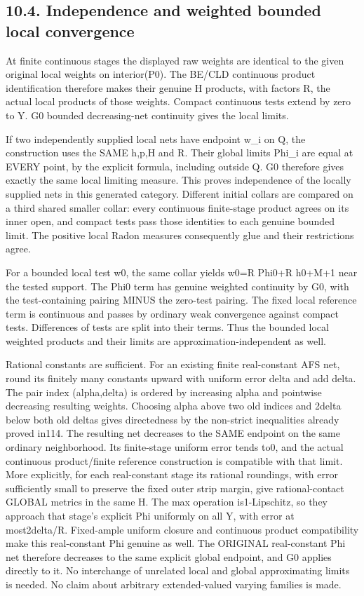 \documentclass[
  10pt,
]{article}
\begin{document}
\subsection{10.4. Independence and weighted bounded local
convergence}\label{independence-and-weighted-bounded-local-convergence}

At finite continuous stages the displayed raw weights are identical to
the given original local weights on interior(P0). The BE/CLD continuous
product identification therefore makes their genuine H products, with
factors R, the actual local products of those weights. Compact
continuous tests extend by zero to Y. G0 bounded decreasing-net
continuity gives the local limits.

If two independently supplied local nets have endpoint w\_i on Q, the
construction uses the SAME h,p,H and R. Their global limits Phi\_i are
equal at EVERY point, by the explicit formula, including outside Q. G0
therefore gives exactly the same local limiting measure. This proves
independence of the locally supplied nets in this generated category.
Different initial collars are compared on a third shared smaller collar:
every continuous finite-stage product agrees on its inner open, and
compact tests pass those identities to each genuine bounded limit. The
positive local Radon measures consequently glue and their restrictions
agree.

For a bounded local test w0, the same collar yields w0=R Phi0+R h0+M+1
near the tested support. The Phi0 term has genuine weighted continuity
by G0, with the test-containing pairing MINUS the zero-test pairing. The
fixed local reference term is continuous and passes by ordinary weak
convergence against compact tests. Differences of tests are split into
their terms. Thus the bounded local weighted products and their limits
are approximation-independent as well.

Rational constants are sufficient. For an existing finite real-constant
AFS net, round its finitely many constants upward with uniform error
delta and add delta. The pair index (alpha,delta) is ordered by
increasing alpha and pointwise decreasing resulting weights. Choosing
alpha above two old indices and 2delta below both old deltas gives
directedness by the non-strict inequalities already proved in114. The
resulting net decreases to the SAME endpoint on the same ordinary
neighborhood. Its finite-stage uniform error tends to0, and the actual
continuous product/finite reference construction is compatible with that
limit. More explicitly, for each real-constant stage its rational
roundings, with error sufficiently small to preserve the fixed outer
strip margin, give rational-contact GLOBAL metrics in the same H. The
max operation is1-Lipschitz, so they approach that stage's explicit Phi
uniformly on all Y, with error at most2delta/R. Fixed-ample uniform
closure and continuous product compatibility make this real-constant Phi
genuine as well. The ORIGINAL real-constant Phi net therefore decreases
to the same explicit global endpoint, and G0 applies directly to it. No
interchange of unrelated local and global approximating limits is
needed. No claim about arbitrary extended-valued varying families is
made.
\end{document}
